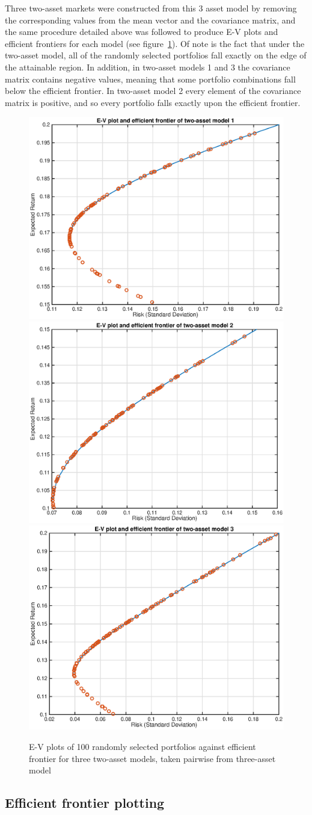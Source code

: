\documentclass[a4paper, 12pt]{article}
\begin{document}
	Three two-asset markets were constructed from this 3 asset model by removing the corresponding values from the mean vector and the covariance matrix, and the same procedure detailed above was followed to produce E-V plots and efficient frontiers for each model (see figure~\ref{fig:p1b}). Of note is the fact that under the two-asset model, all of the randomly selected portfolios fall exactly on the edge of the attainable region. In addition, in two-asset models 1 and 3 the covariance matrix contains negative values, meaning that some portfolio combinations fall below the efficient frontier. In two-asset model 2 every element of the covariance matrix is positive, and so every portfolio falls exactly upon the efficient frontier.

	\begin{figure}
		\begin{center}
			\includegraphics[width=0.3\linewidth]{figures/p1b_1.eps}
			\includegraphics[width=0.3\linewidth]{figures/p1b_2.eps}
			\includegraphics[width=0.3\linewidth]{figures/p1b_3.eps}
		\end{center}
		\caption{E-V plots of 100 randomly selected portfolios against efficient frontier for three two-asset models, taken pairwise from three-asset model}
		\label{fig:p1b}
	\end{figure}

	\subsection{Efficient frontier plotting}
\end{document}
